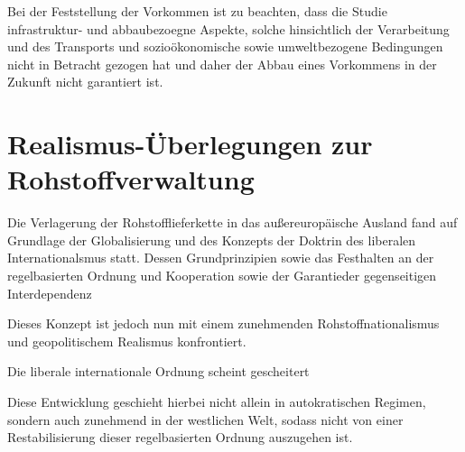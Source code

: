 \documentclass[12pt,a4paper,oneside]{book} %
\begin{document}
{Bei der Feststellung der Vorkommen ist zu beachten, dass die Studie infrastruktur- und abbaubezoegne Aspekte, solche hinsichtlich der Verarbeitung und des Transports und sozioökonomische sowie umweltbezogene Bedingungen nicht in Betracht gezogen hat und daher der Abbau eines Vorkommens in der Zukunft nicht garantiert ist.

\section{Realismus-Überlegungen zur Rohstoffverwaltung}

Die Verlagerung der Rohstofflieferkette in das außereuropäische Ausland fand auf Grundlage der Globalisierung und des Konzepts der Doktrin des liberalen Internationalsmus statt. Dessen Grundprinzipien sowie das Festhalten an der regelbasierten Ordnung und Kooperation sowie der \glqq Garantie\grqq der gegenseitigen Interdependenz

Dieses Konzept ist jedoch nun mit einem zunehmenden Rohstoffnationalismus und geopolitischem Realismus konfrontiert.

Die liberale internationale Ordnung scheint gescheitert \autocite{Mearsheimer, J.: Bound to Fail, International Security 2019, 43 4, 7.50}


Diese Entwicklung geschieht hierbei nicht allein in autokratischen Regimen, sondern auch zunehmend in der westlichen Welt, sodass nicht von einer Restabilisierung dieser regelbasierten Ordnung auszugehen ist.\autocite{McKeil 2021: The limits of realism}

}
\end{document}

